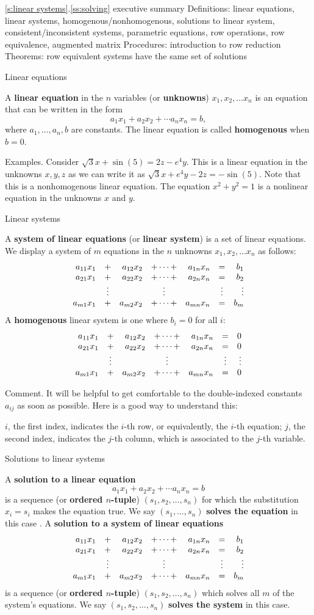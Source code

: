 \begin{frame}{\ref{s:linear systems}.\ref{ss:solving} executive summary}
\footnotesize
\alert{Definitions}: linear equations, linear systems, homogenous/nonhomogenous, solutions to linear system, consistent/inconsistent systems, parametric equations, row operations, row equivalence, augmented matrix
\bspace
\alert{Procedures}: introduction to row reduction
\bspace
\alert{Theorems}: row equivalent systems have the same set of solutions
\end{frame}
\begin{frame}{Linear equations}
\begin{definition}
A {\bf linear equation} in the $n$ variables (or {\bf unknowns}) $x_1,x_2,\dots x_n$ is an equation that can be written in the form 
\[
a_1x_1+a_2x_2+\cdots a_nx_n=b,
\] 
where $a_1,\dots, a_n, b$ are constants. 
\bpause
The linear equation is called {\bf homogenous} when $b=0$.
\end{definition}
\pause
\alert{Examples}.
\bb
\ii Consider $\sqrt{3}x+\sin(5)=2z-e^4y$. \pause This is a linear equation in the unknowns $x,y,z$ as we can write it as $\sqrt{3}x+e^4y-2z=-\sin(5)$. Note that this is a \alert{nonhomogenous} linear equation. 
\pause\ii The equation $x^2+y^2=1$ is a \alert{nonlinear} equation in the unknowns $x$ and $y$.   
\ee
\end{frame}
\begin{frame}[plain]{Linear systems}\footnotesize
\begin{definition}
A {\bf system of linear equations} (or {\bf linear system}) is a set of linear equations.
\bpause
We display a system of $m$ equations in the $n$ unknowns $x_1,x_2,\dots x_n$ as follows:
\[
\begin{array}{rcrcrcr} a_{11}x_{1}&+&a_{12}x_{2}&+\cdots+& a_{1n}x_{n}&=&b_1\\ a_{21}x_{1}&+&a_{22}x_{2}&+\cdots+&a_{2n}x_{n}&=&b_2\\ &\vdots& &\vdots & &\vdots & \vdots\\ a_{m1}x_{1}&+&a_{m2}x_{2}&+\cdots +&a_{mn}x_{n}&=&b_m \end{array}
\]
\pause A {\bf homogenous} linear system is one where $b_i=0$ for all $i$:
\[
\begin{array}{rcrcrcr} a_{11}x_{1}&+&a_{12}x_{2}&+\cdots+& a_{1n}x_{n}&=&0\\ a_{21}x_{1}&+&a_{22}x_{2}&+\cdots+&a_{2n}x_{n}&=&0\\ &\vdots& &\vdots & &\vdots & \vdots\\ a_{m1}x_{1}&+&a_{m2}x_{2}&+\cdots +&a_{mn}x_{n}&=&0 \end{array}
\]
\end{definition}
\pause
\alert{Comment.} It will be helpful to get comfortable to the double-indexed constants $a_{ij}$ as soon as possible. Here is a good way to understand this:
\begin{itemize}
\pause\ii $i$, the first index, indicates the $i$-th {\color{red}row}, or equivalently, the $i$-th equation;
\pause\ii $j$, the second index, indicates the $j$-th {\color{blue} column}, which is associated to the $j$-th variable. 
\end{itemize}
\end{frame}
\begin{frame}{Solutions to linear systems}
\begin{definition}
A {\bf solution to a linear equation}
\[
a_1x_1+a_2x_2+\cdots a_nx_n=b
\]
is a \alert{sequence} (or {\bf ordered $n$-tuple})  $(s_1,s_2,\dots, s_n)$ for which the substitution $x_i=s_i$ makes the equation true.
We say $(s_1,\dots ,s_n)$ {\bf solves the equation} in this case . 
\bpause
A {\bf solution to a system of linear equations}
\[
\begin{array}{rcrcrcr} a_{11}x_{1}&+&a_{12}x_{2}&+\cdots+& a_{1n}x_{n}&=&b_1\\ a_{21}x_{1}&+&a_{22}x_{2}&+\cdots+&a_{2n}x_{n}&=&b_2\\ &\vdots& &\vdots & &\vdots & \vdots\\ a_{m1}x_{1}&+&a_{m2}x_{2}&+\cdots +&a_{mn}x_{n}&=&b_m \end{array}
\]
is a \alert{sequence} (or {\bf ordered $n$-tuple})  $(s_1,s_2,\dots, s_n)$ which solves all $m$ of the system's equations. We say $(s_1,s_2,\dots, s_n)$ {\bf solves the system} in this case. 
\end{definition}
\end{frame}
